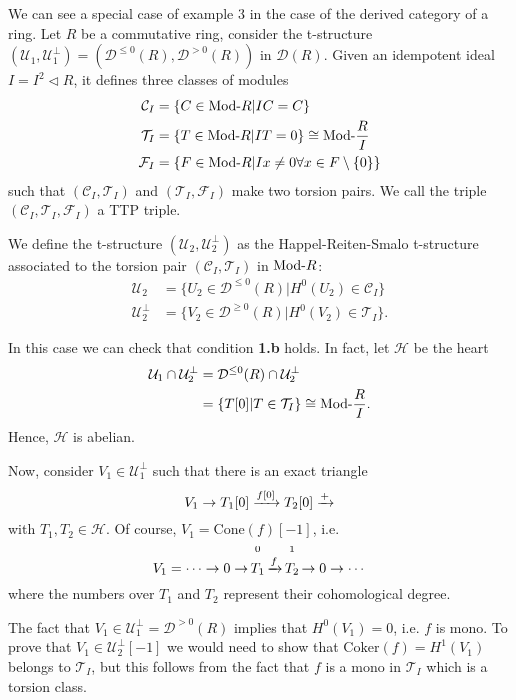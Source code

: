 We can see a special case of example 3 in the case of the derived category of a ring.
Let $R$ be a commutative ring, consider the t-structure $(\mathcal{U}_1,\mathcal{U}_1^\perp)=(\mathcal{D}^{\leq 0}(R), \mathcal{D}^{>0}(R))$
in $\mathcal{D}(R)$. Given an idempotent ideal $I=I^2\lhd R$, it defines three classes of modules
\begin{align*}
  \mathcal{C}_I &= \{ C\in\mathrm{\textup{Mod-}}R | IC=C\}\\
  \mathcal{T}_I &= \{ T\in\mathrm{\textup{Mod-}}R | IT=0\} \cong \mathrm{\textup{Mod-}}\frac{R}{I}\\
  \mathcal{F}_I &= \{ F\in\mathrm{\textup{Mod-}}R | Ix \neq 0 \forall x\in F\setminus \{0\} \}
\end{align*}
such that $(\mathcal{C}_I, \mathcal{T}_I)$ and $(\mathcal{T}_I,\mathcal{F}_I)$ make two torsion pairs.
We call the triple $(\mathcal{C}_I,\mathcal{T}_I,\mathcal{F}_I)$ a TTP triple.

We define the t-structure $(\mathcal{U}_2,\mathcal{U}_2^\perp)$ as the Happel-Reiten-Smalo t-structure
associated to the torsion pair $(\mathcal{C}_I,\mathcal{T}_I)$ in $\mathrm{\textup{Mod-}}R$:
\begin{align*}
  \mathcal{U}_2 &= \{ U_2\in\mathcal{D}^{\leq 0}(R) | H^0(U_2)\in\mathcal{C}_I \} \\
  \mathcal{U}_2^\perp &= \{ V_2\in\mathcal{D}^{\geq 0}(R) | H^0(V_2)\in\mathcal{T}_I \}.
\end{align*}

In this case we can check that condition \textbf{1.b} holds. In fact, let $\mathcal{H}$ be the heart
\begin{align*}
  \mathcal{U}_1\cap\mathcal{U}_2^\perp &= \mathcal{D}^{\leq 0}(R)\cap \mathcal{U}_2^\perp \\
  &= \{ T[0] | T\in\mathcal{T}_I \} \cong \mathrm{\textup{Mod-}}\frac{R}{I}.
\end{align*}
Hence, $\mathcal{H}$ is abelian.

Now, consider $V_1\in\mathcal{U}_1^\perp$ such that there is an exact triangle
\begin{equation*}
  V_1\to T_1[0]\xrightarrow{f[0]}T_2[0]\xrightarrow{+}
\end{equation*}
with $T_1,T_2\in\mathcal{H}$. Of course, $V_1 = \mathrm{Cone}(f)[-1]$, i.e.
\begin{equation*}
  V_1 = \cdots \to0\to\,\oset[2ex]{\small 0}{T_1}\,\nto{f}\,\oset[2ex]{\small 1}{T_2}\,\to 0\to \cdots
\end{equation*}
where the numbers over $T_1$ and $T_2$ represent their cohomological degree.

The fact that $V_1\in\mathcal{U}_1^\perp = \mathcal{D}^{> 0}(R)$ implies that $H^0(V_1)=0$, i.e. $f$ is mono.
To prove that $V_1\in\mathcal{U}_2^\perp[-1]$ we would need to show that $\mathrm{Coker}(f)=H^1(V_1)$ belongs to $\mathcal{T}_I$,
but this follows from the fact that $f$ is a mono in $\mathcal{T}_I$ which is a torsion class.

